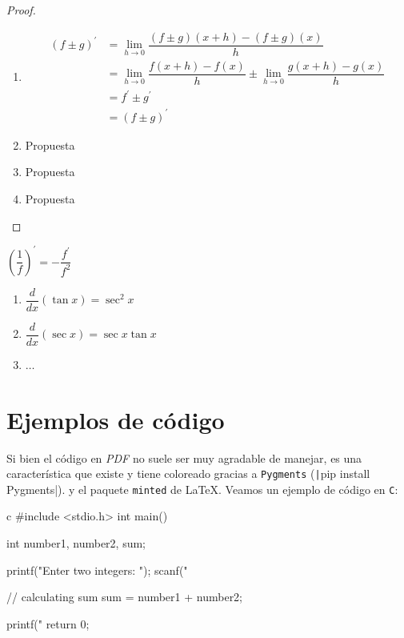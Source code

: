 \begin{proof}
    \begin{enumerate}
        \item 
        \begin{align*}
            (f \pm g)^\prime & = \lim_{h \to 0} \dfrac{(f \pm g)(x+h)-(f \pm g)(x)}{h} \\
            & = \lim_{h \to 0} \dfrac{f(x+h)-f(x)}{h} \pm \lim_{h \to 0} \dfrac{g(x+h)-g(x)}{h} \\
            & = f^\prime \pm g^\prime \\
            & = (f \pm g)^\prime 
        \end{align*}
        \item Propuesta
        \item Propuesta
        \item Propuesta
    \end{enumerate}
\end{proof}

\begin{cor}
    $\left(\dfrac{1}{f}\right)^\prime = -\dfrac{f^\prime}{f^2}$
\end{cor}

\begin{exs}\leavevmode
    \begin{enumerate}
        \item $\dfrac{d}{dx}(\tan{x}) = \sec^2{x}$
        \item $\dfrac{d}{dx}(\sec{x}) = \sec{x}\tan{x}$
        \item $\dots$
    \end{enumerate}
\end{exs}

\newpage

\section{Ejemplos de código}

\noindent
Si bien el código en \textit{PDF} no suele ser muy agradable de manejar, es una característica que existe y tiene coloreado gracias a \texttt{Pygments} (\texttt|pip install Pygments|). y el paquete \texttt{minted} de \LaTeX{}. Veamos un ejemplo de código en \texttt{C}: \\

\begin{codecaption}
    \begin{mintedcode}{c}
        #include <stdio.h>
        int main() {    

            int number1, number2, sum;
            
            printf("Enter two integers: ");
            scanf("%

            // calculating sum
            sum = number1 + number2;      
            
            printf("%
            return 0;
        }
    \end{mintedcode}
\caption{Ejemplo de suma de dos enteros en C}
\end{codecaption}

